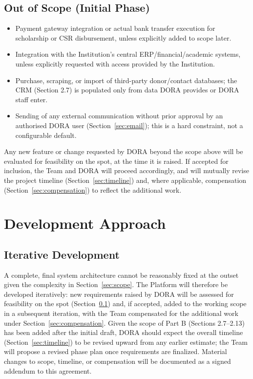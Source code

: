 \documentclass[11pt]{article}
\begin{document}
\subsection{Out of Scope (Initial Phase)}
\label{sec:oos}
\begin{itemize}[leftmargin=1.4em, itemsep=3pt]
\item Payment gateway integration or actual bank transfer execution for scholarship or CSR disbursement, unless explicitly added to scope later.
\item Integration with the Institution's central ERP/financial/academic systems, unless explicitly requested with access provided by the Institution.
\item Purchase, scraping, or import of third-party donor/contact databases; the CRM (Section 2.7) is populated only from data DORA provides or DORA staff enter.
\item Sending of any external communication without prior approval by an authorised DORA user (Section~\ref{sec:email}); this is a hard constraint, not a configurable default.
\end{itemize}

Any new feature or change requested by DORA beyond the scope above will be evaluated for feasibility on the spot, at the time it is raised. If accepted for inclusion, the Team and DORA will proceed accordingly, and will mutually revise the project timeline (Section~\ref{sec:timeline}) and, where applicable, compensation (Section~\ref{sec:compensation}) to reflect the additional work.

\section{Development Approach}

\subsection{Iterative Development}
\label{sec:iterative}
A complete, final system architecture cannot be reasonably fixed at the outset given the complexity in Section~\ref{sec:scope}. The Platform will therefore be developed iteratively: new requirements raised by DORA will be assessed for feasibility on the spot (Section~\ref{sec:oos}) and, if accepted, added to the working scope in a subsequent iteration, with the Team compensated for the additional work under Section~\ref{sec:compensation}. Given the scope of Part B (Sections 2.7--2.13) has been added after the initial draft, DORA should expect the overall timeline (Section~\ref{sec:timeline}) to be revised upward from any earlier estimate; the Team will propose a revised phase plan once requirements are finalized. Material changes to scope, timeline, or compensation will be documented as a signed addendum to this agreement.
\end{document}
